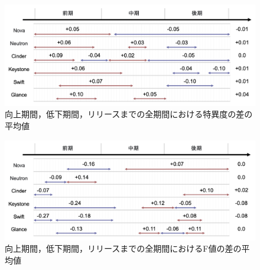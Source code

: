 \documentclass[11pt]{jreport}
\begin{document}
\begin{figure}[t]
\begin{center}
    \includegraphics[width=1.0\textwidth]{Uenaka_fig/RQ2_result/merge_S.pdf}
    \caption{向上期間，低下期間，リリースまでの全期間における特異度の差の平均値}
    \label{fig:merge_prepare_S}
\end{center}
\end{figure}

\begin{figure}[t]
\begin{center}
    \includegraphics[width=1.0\textwidth]{Uenaka_fig/RQ2_result/merge_F.pdf}
    \caption{向上期間，低下期間，リリースまでの全期間におけるF値の差の平均値}
    \label{fig:merge_prepare_F}
\end{center}
\end{figure}
\end{document}
